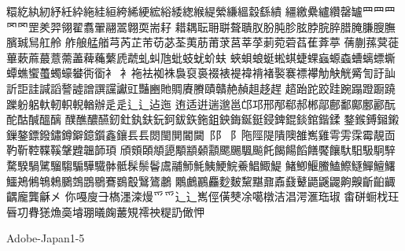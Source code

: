 糫紇紈紉紓紝紣絁絓絙絝絺綆綋綌緌緫緱緹縈縑縕縠繇繢
繮繳纍纑纘罄罏⺫⺲罒⺱罓罡羑羿翎翟翥翬翮翯翺耎耑耔
耤耦耺耼聠聱聵肞肦肫胗胘脖脘脺腊腌膁膄膴臏臹舃舡舲
舴艆艋艏芎芮芷芾苆苾荃荑荕莆莍莒莘莩莿菀菪萏萑葊葶
蒨蒯蓀蓂蓰蓽蔌蔴蕞薏薷藎薭蘒蘩虒虣虬虯虺蚍蚑蚘蚧蚨
蛺蛽蜋蜓蜙蜞蜨蜾蝱螈螙螬螭螵蟖蟫蟭蠁蠆蠋蠔蠜衖衟⻂
衤袘袪袽袾裊裒裛裰裱褆褘褙褚褧褰褾襻觔觖觥觱訇訏訕
訢詎詿諴謟謷譃譄譔讜讞豇豔豳貤賙賡賸賾贛赩赬趄趍趕
趦跆跎跤跬踠蹋蹬蹰蹺躒躮躳軑軔軹輗輶辦⾡辵⻍辶迠迤
迶适逬遄邈邕邙邛邢邴郗郝郴鄗鄜鄱鄺鄽酈酛酡酤醎醞醨
醭醮醲醼釰釷釻鈇鈨鈳鈸鉃鉇鉏鉠鋂鋋鋌鋟錍錕錟錧鍇鍒
鍪鍭鎛鎺鎩鏁鏊鏢鏺鏽鐏鐴鐿鑕鑫鑲⻒镸閦閩閴閽闚⻏⻖
阝陁陘隄隤隩雒嶲雞雩雱霂霉靚靣靮靳鞚鞢鞵鞶韙韞韴頊
頎頞頣頫頾顒顓顙顬颸颺颿飈飥餲餳饀饍饜饟馱馹馺駉騂
騖騤騧騭騮騶騸驊驖骵骶髹鬃鬠鬳鬴魳魹鮧鯁鯇鯗鯧鯫鯷
鯺鯽鰋鰧鰪鰶鱁鱓鱣鱰鱷鴂鵂鵇鵣鵩鵼鵾鶍鶱鷃鷇鷖鷟鷫
鷴鸕鸝麤麨麬黧黮鼐鼒鼗鼙鼯鼷鼹齁齅齗齨齱齵龐龔龢㐅
你嘠廋⺕𣘺濹滦熳⺤爫⻌辶嶲俓僙僰凃噶橔洁淐湂滙珤琡
畬硑蟵𣏾玨㫳㓛䐌㺊龽䯨龼㻚㬢龾䕺䂓䙥䄃䊓䚮㒈𢘉

Adobe-Japan1-5

